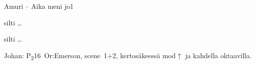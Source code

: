 \documentclass[12pt,a4paper]{article}
\begin{document}
\begin{mysong}{Amuri – Aika meni jo}{1}
\begin{SBChorus}
   silti    
    \ldots{}

   silti    
    \ldots{}
\end{SBChorus}


{\SBLyricNoteFont Johan: P\textsubscript{2}16~Or:Emerson, scene~1+2,
kertosäkeessä mod$\uparrow$ ja kahdella oktaavilla.}

\end{mysong}
\end{document}
